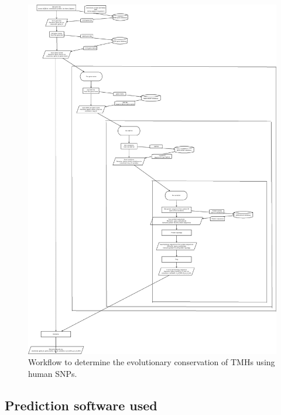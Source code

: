 \begin{figure}[!htbp]
  \includegraphics[height=0.9\textheight]{snp_workflow.png}
  \caption{
    Workflow to determine the evolutionary conservation of TMHs
    using human SNPs.
  }
  \label{fig:snp_workflow}
\end{figure}

\subsection{Prediction software used}
\label{subsec:prediction_software_used}

